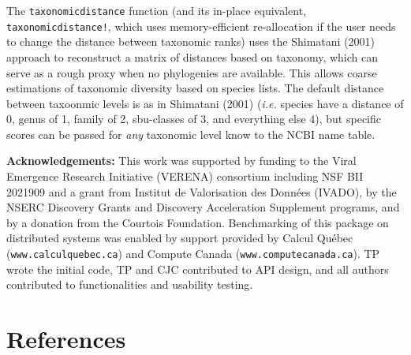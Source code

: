 \documentclass[10pt,oneside]{article}
\begin{document}
The \texttt{taxonomicdistance} function (and its in-place equivalent,
\texttt{taxonomicdistance!}, which uses memory-efficient re-allocation
if the user needs to change the distance between taxonomic ranks) uses
the Shimatani (2001) approach to reconstruct a matrix of distances based
on taxonomy, which can serve as a rough proxy when no phylogenies are
available. This allows coarse estimations of taxonomic diversity based
on species lists. The default distance between taxoonmic levels is as in
Shimatani (2001) (\emph{i.e.} species have a distance of 0, genus of 1,
family of 2, sbu-classes of 3, and everything else 4), but specific
scores can be passed for \emph{any} taxonomic level know to the NCBI
name table.

\textbf{Acknowledgements:} This work was supported by funding to the
Viral Emergence Research Initiative (VERENA) consortium including NSF
BII 2021909 and a grant from Institut de Valorisation des Données
(IVADO), by the NSERC Discovery Grants and Discovery Acceleration
Supplement programs, and by a donation from the Courtois Foundation.
Benchmarking of this package on distributed systems was enabled by
support provided by Calcul Québec (\texttt{www.calculquebec.ca}) and
Compute Canada (\texttt{www.computecanada.ca}). TP wrote the initial
code, TP and CJC contributed to API design, and all authors contributed
to functionalities and usability testing.

\hypertarget{references}{%
\section*{References}\label{references}}
\end{document}
